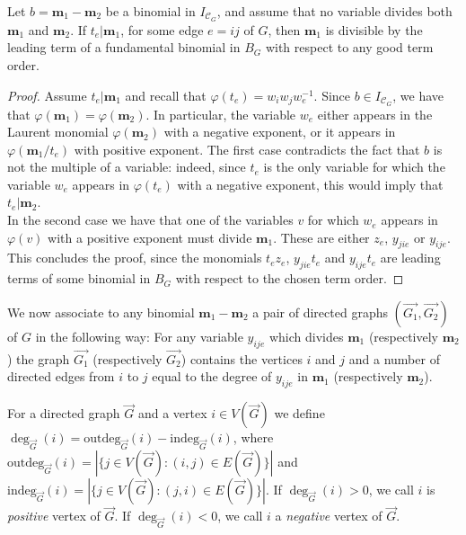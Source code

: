 \begin{lemm}\label{lem: yij(e)}
    Let $b = \mathbf{m}_1 - \mathbf{m}_2$ be a binomial in $I_{\mathcal{C}_G}$, and assume that no variable divides both $\mathbf{m}_1$ and $\mathbf{m}_2$. If $t_{e}|\mathbf{m}_1$, for some edge $e=ij$ of $G$, then $\mathbf{m}_1$ is divisible by the leading term of a fundamental binomial in $B_G$ with respect to any good term order.
\end{lemm}
\begin{proof}
     Assume $t_{e}|\mathbf{m}_1$ and recall that $\varphi(t_{e})=w_iw_jw_e^{-1}$. Since $b\in I_{\mathcal{C}_G}$, we have that $\varphi(\mathbf{m}_1)=\varphi(\mathbf{m}_2)$. In particular, the variable $w_{e}$ either appears in the Laurent monomial $\varphi(\mathbf{m}_2)$ with a negative exponent, or it appears in $\varphi(\mathbf{m}_1/t_{e})$ with positive exponent. The first case contradicts the fact that $b$ is not the multiple of a variable: indeed, since $t_{e}$ is the only variable for which the variable $w_e$ appears in $\varphi(t_{e})$ with a negative exponent, this would imply that $t_{e}|\mathbf{m}_2$.\\
     In the second case we have that one of the variables $v$ for which $w_e$ appears in $\varphi(v)$ with a positive exponent must divide $\mathbf{m}_1$. These are either $z_e$, $y_{jie}$ or $y_{ije}$. 
     This concludes the proof, since the monomials $t_{e}z_e$, $y_{jie}t_{e}$ and $y_{ije}t_{e}$ are leading terms of some binomial in $B_G$ with respect to the chosen term order. 
\end{proof}

We now associate to any binomial $\mathbf{m}_1 - \mathbf{m}_2$ a pair of directed graphs $(\overrightarrow{G_1},\overrightarrow{G_2})$ of $G$ in the following way:
For any variable $y_{ije}$ which divides $\mathbf{m}_1$ (respectively $\mathbf{m}_2$) the graph $\overrightarrow{G_1}$ (respectively $\overrightarrow{G_2}$) contains the vertices $i$ and $j$ and a number of directed edges from $i$ to $j$ equal to the degree of $y_{ije}$ in $\mathbf{m}_1$ (respectively $\mathbf{m}_2$).
\begin{defi}
	For a directed graph $\overrightarrow{G}$ and a vertex $i\in V(\overrightarrow{G})$ we define $\deg_{\overrightarrow{G}}(i)=\text{outdeg}_{\overrightarrow{G}}(i)-\text{indeg}_{\overrightarrow{G}}(i)$, where $\text{outdeg}_{\overrightarrow{G}}(i) = |\{j\in V(\overrightarrow{G}) : (i,j)\in E(\overrightarrow{G})\}|$ and $\text{indeg}_{\overrightarrow{G}}(i) = |\{j\in V(\overrightarrow{G}) : (j,i)\in E(\overrightarrow{G})\}|$. If $\deg_{\overrightarrow{G}}(i)>0$, we call $i$ is  \emph{positive} vertex of  $\overrightarrow{G}$.  If $\deg_{\overrightarrow{G}}(i)<0$, we call $i$ a \emph{negative} vertex of  $\overrightarrow{G}$.
\end{defi}

